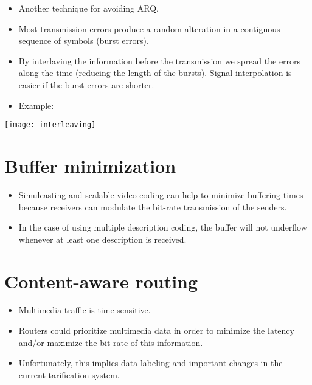 \begin{itemize}
\item Another technique for avoiding ARQ.
\item Most transmission errors produce a random alteration in a contiguous
  sequence of symbols (burst errors).
\item By interlaving the information before the transmission we spread
  the errors along the time (reducing the length of the bursts). Signal
  interpolation is easier if the burst errors are shorter.
\item Example:
\end{itemize}
\begin{center}
  \texttt{[image: interleaving]}
\end{center}


\section{Buffer minimization}

\begin{itemize}
\item Simulcasting and scalable video coding can help to minimize
  buffering times because receivers can modulate the bit-rate
  transmission of the senders.
\item In the case of using multiple description coding, the buffer
  will not underflow whenever at least one description is received.
\end{itemize}


\section{Content-aware routing}

\begin{itemize}
\item Multimedia traffic is time-sensitive.
\item Routers could prioritize multimedia data in order to minimize the
  latency and/or maximize the bit-rate of this information.
\item Unfortunately, this implies data-labeling and important changes
  in the current tarification system.
\end{itemize}


